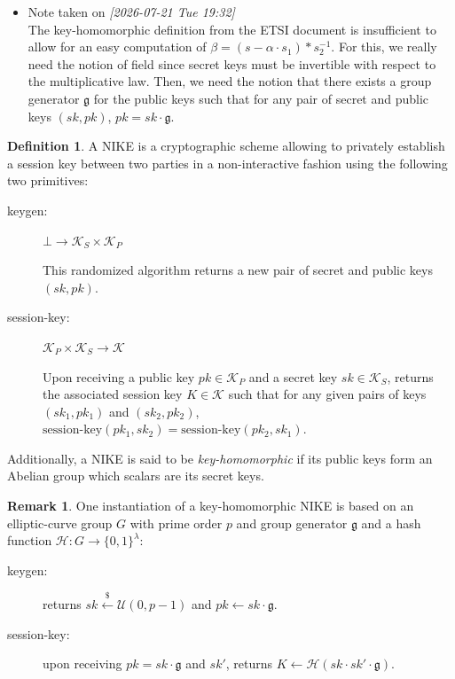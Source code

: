 \documentclass[a4paper]{article}
\theoremstyle{definition}
\newtheorem{definition}{Definition}[section]
\newtheorem*{remark}{Remark}
\newcommand{\cH}{\mathcal{H}}
\newcommand{\cK}{\mathcal{K}}
\newcommand{\cU}{\mathcal{U}}
\begin{document}
\begin{itemize}
\item Note taken on \textit{{[}2026-07-21 Tue 19:32] } \\
The key-homomorphic definition  from the ETSI document is  insufficient to allow
for an  easy computation of  \(\beta =  (s - \alpha  \cdot s_1) *  s_2^{-1}\). For
this, we really  need the notion of  field since secret keys  must be invertible
with respect  to the multiplicative  law.  Then, we  need the notion  that there
exists a  group generator \(\mathfrak  g\) for the public  keys such that  for any
pair of secret and public keys \((sk, pk)\), \(pk = sk \cdot \mathfrak g\).
\end{itemize}
\begin{definition}
A NIKE is  a cryptographic scheme allowing to privately  establish a session key
between  two  parties in  a  non-interactive  fashion  using the  following  two
primitives:
\begin{description}
\item[{keygen:}] \(\bot \rightarrow \cK_S \times \cK_P\)

This randomized algorithm  returns a new pair of secret  and public keys \((sk,
  pk)\).

\item[{session-key:}] \(\cK_P \times \cK_S \rightarrow \cK\)

Upon receiving a  public key \(pk \in  \cK_P\) and a secret key  \(sk \in \cK_S\),
returns the associated session  key \(K \in \cK\) such that  for any given pairs
of keys \((sk_1, pk_1)\)  and \((sk_2, pk_2)\), \(\mathrm{session\text{-}key}(pk_1,
  sk_2) = \mathrm{session\text{-}key}(pk_2, sk_1)\).
\end{description}
Additionally, a NIKE is said to be  \emph{key-homomorphic} if its public keys form an
Abelian group which scalars are its secret keys.
\end{definition}

\begin{remark}
One instantiation of a key-homomorphic NIKE  is based on an elliptic-curve group
\(G\) with prime order  \(p\) and group generator \(\mathfrak g\)  and a hash function
\(\cH : G \rightarrow \{0,1\}^\lambda\):

\begin{description}
\item[{keygen:}] returns \(sk  \overset{\mathdollar}{\longleftarrow} \cU(0, p-1)\) and
\(pk \gets sk \cdot \mathfrak g\).

\item[{session-key:}] upon receiving \(pk = sk \cdot \mathfrak g\) and \(sk'\), returns
\(K \gets \cH(sk \cdot sk' \cdot \mathfrak g)\).
\end{description}
\end{remark}
\end{document}
